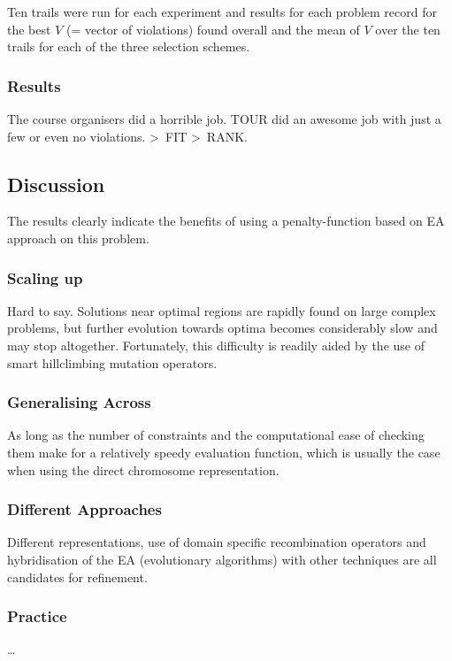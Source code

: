\documentclass[12pt]{article}
\begin{document}
Ten trails were run for each experiment and results for each problem record for the best $V$ (= vector of violations) found overall and the mean of $V$ over the ten trails for each of the three selection schemes.

\subsubsection{Results}
The course organisers did a horrible job. TOUR did an awesome job with just a few or even no violations. \textgreater\ FIT \textgreater\ RANK.

\subsection{Discussion}
The results clearly indicate the benefits of using a penalty-function based on EA approach on this problem.

\subsubsection{Scaling up}
Hard to say. Solutions near optimal regions are rapidly found on large complex problems, but further evolution towards optima becomes considerably slow and may stop altogether. Fortunately, this difficulty is readily aided by the use of smart hillclimbing mutation operators.

\subsubsection{Generalising Across}
As long as the number of constraints and the computational ease of checking them make for a relatively speedy evaluation function, which is usually the case when using the direct chromosome representation.

\subsubsection{Different Approaches}
Different representations, use of domain specific recombination operators and hybridisation of the EA (evolutionary algorithms) with other techniques are all candidates for refinement.

\subsubsection{Practice}
\dots
\end{document}
